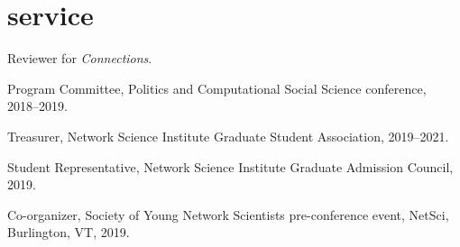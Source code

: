 \documentclass[11pt, letter]{article}
\begin{document}
 \section{service}
 Reviewer for \textit{Connections}.

 Program Committee, Politics and Computational Social Science conference,
 2018--2019.

 Treasurer, Network Science Institute Graduate Student Association, 2019--2021.

 Student Representative, Network Science Institute Graduate Admission Council,
 2019.

 Co-organizer, Society of Young Network Scientists pre-conference event, NetSci,
 Burlington, VT, 2019.
\end{document}
